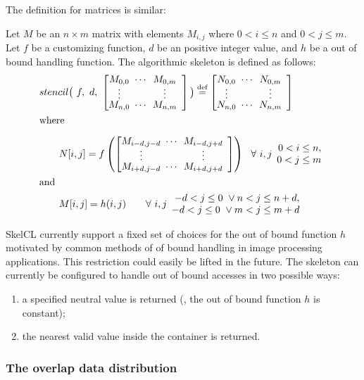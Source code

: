 \noindent
The definition for matrices is similar:
\begin{definition}
  \label{definition:mapoverlap:matrix}
  Let $M$ be an $n\times m$ matrix with elements $M_{i,j}$ where $0 < i \leq n$ and $0 < j \leq m$.
  Let $f$ be a customizing function, $d$ be an positive integer value, and $h$ be a out of bound handling function.
  The algorithmic skeleton \stencil is defined as follows:
  \begin{equation*}
    \begin{split}
    & stencil \big(\ f,\  d,\ \DottedMatrix{M_{0,0}}{M_{0,m}}{M_{n,0}}{M_{n,m}}\big)
               \eqdef \DottedMatrix{N_{0,0}}{N_{0,m}}{N_{n,0}}{N_{n,m}}\\
               &\text{where}\\[.5em]
    &\qquad N[i,j] = f\left(\DottedMatrix{M_{i-d,j-d}}{M_{i-d,j+d}}{M_{i+d,j-d}}{M_{i+d,j+d}}\right)\ \ \forall\ i,j
        \begin{array}{r} 0 < i \leq n,\\ 0 < j \leq m \end{array}\\
        &\text{and}\\
    &\qquad M[i,j] = h(i,j) \qquad \forall\ i,j \begin{array}{r} -d < j \leq 0\ \vee n < j \leq n+d,\\ -d < j \leq 0\ \vee m < j \leq m+d \end{array}
    \end{split}
  \end{equation*}
\end{definition}


SkelCL currently support a fixed set of choices for the out of bound function $h$ motivated by common methods of of bound handling in image processing applications.
This restriction could easily be lifted in the future.
The \stencil skeleton can currently be configured to handle out of bound accesses in two possible ways:
\begin{enumerate}
  \item a specified neutral value is returned (\ie, the out of bound function $h$ is constant);
  \item the nearest valid value inside the container is returned.
\end{enumerate}



\subsubsection{The overlap data distribution}

